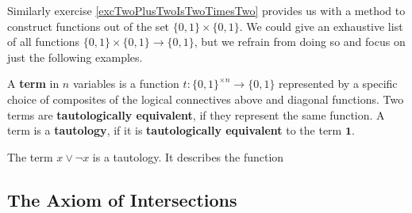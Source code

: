 \documentclass{article}
\begin{document}
	Similarly exercise \ref{excTwoPlusTwoIsTwoTimesTwo} provides us with a method to construct functions out of the set $\{0,1\}\times\{0,1\}$. We could give an exhaustive list of all functions $\{0,1\}\times\{0,1\} \rightarrow \{0,1\}$, but we refrain from doing so and focus on just the following examples.

	\begin{definition}
		A \textbf{term} in $n$ variables is a function $t:\{0,1\}^{\times n} \rightarrow \{0,1\}$ represented by a specific choice of composites of the logical connectives above and diagonal functions. Two terms are \textbf{tautologically equivalent}, if they represent the same function. A term is a \textbf{tautology}, if it is \textbf{tautologically equivalent} to the term $\mathbf{1}$.
	\end{definition}

	\begin{example}
		The term $x\lor \lnot x$ is a tautology. It describes the function
	\end{example}





	\newpage
	\subsection{The Axiom of Intersections}

\end{document}
